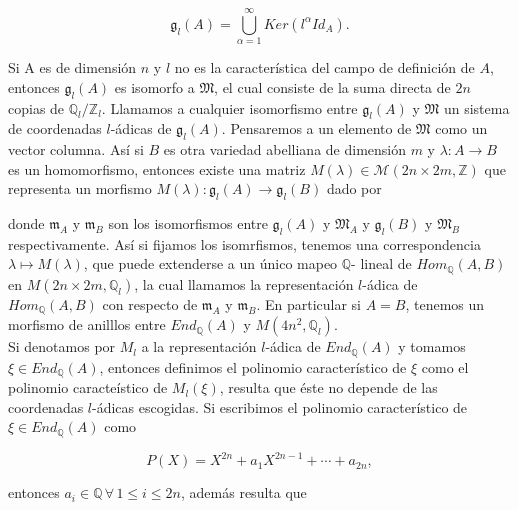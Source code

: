 \documentclass[letterpaper]{report}
\newcommand{\rac}{\ensuremath{ \mathbb Q }}
\newcommand{\dbz}{\ensuremath{ \mathbb Z }}
\begin{document}
\begin{equation}
	\mathfrak{g}_{l}(A)=\bigcup_{\alpha=1}^{\infty}Ker(l^{\alpha}Id_A).
\end{equation}

\noindent Si A es de dimensión $n$ y $l$ no es la característica del campo de definición de $A$, entonces $\mathfrak{g}_l(A)$ es isomorfo a $\mathfrak{M}$, el cual consiste de la suma directa de $2n$ copias de $\rac_l/\dbz_l$. Llamamos a cualquier isomorfismo entre $\mathfrak{g}_l(A)$ y $\mathfrak{M}$ un sistema de coordenadas $l$-ádicas de $\mathfrak{g}_l(A)$. Pensaremos a un elemento de $\mathfrak{M}$ como un vector columna. Así si $B$ es otra variedad abelliana de dimensión $m$ y $\lambda:A\rightarrow B$ es un homomorfismo, entonces existe una matriz $M(\lambda)\in \mathcal{M}(2n\times 2m,\dbz)$ que representa un morfismo $M(\lambda):\mathfrak{g}_l(A)\rightarrow\mathfrak{g}_l(B)$ dado por 

\begin{center}
\end{center}

\noindent donde $\mathfrak{m}_A$ y $\mathfrak{m}_B$ son los isomorfismos entre $\mathfrak{g}_l(A)$ y $\mathfrak{M}_A$ y $\mathfrak{g}_l(B)$ y $\mathfrak{M}_B$ respectivamente. Así si fijamos los isomrfismos, tenemos una correspondencia $\lambda\mapsto M(\lambda)$, que puede extenderse a un único mapeo $\rac$- lineal de $Hom_{\rac}(A,B)$ en $M(2n\times 2m,\rac_l)$, la cual llamamos la representación $l$-ádica de $Hom_{\rac}(A,B)$ con respecto de $\mathfrak{m}_A$ y $\mathfrak{m}_B$.
En particular si $A=B$, tenemos un morfismo de anilllos entre $End_{\rac}(A)$ y $M(4n^2,\rac_l)$.\\
Si denotamos por $M_l$ a la representación $l$-ádica de $End_{\rac}(A)$ y tomamos $\xi\in End_{\rac}(A)$, entonces definimos el polinomio característico de $\xi$ como el polinomio caracteístico de $M_l(\xi)$, resulta que éste no depende de las coordenadas $l$-ádicas escogidas. Si escribimos el polinomio característico de $\xi\in End_{\rac}(A)$ como 

$$P(X)=X^{2n}+a_1X^{2n-1}+\cdots+a_{2n},$$

\noindent entonces $a_i\in\rac\,\forall\,1\leq i\leq 2n$, además resulta que 
\end{document}
